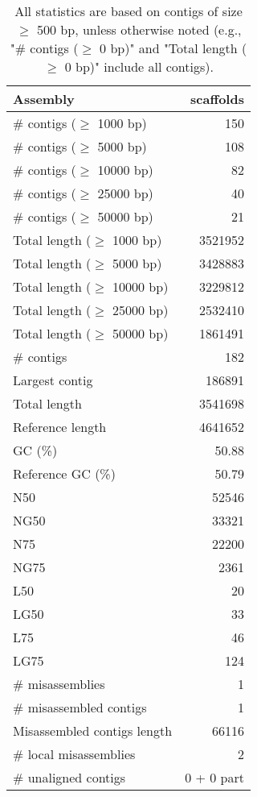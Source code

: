 \documentclass[12pt,a4paper]{article}
\begin{document}
\begin{table}[ht]
\begin{center}
\caption{All statistics are based on contigs of size $\geq$ 500 bp, unless otherwise noted (e.g., "\# contigs ($\geq$ 0 bp)" and "Total length ($\geq$ 0 bp)" include all contigs).}
\begin{tabular}{|l*{1}{|r}|}
\hline
Assembly & scaffolds \\ \hline
\# contigs ($\geq$ 1000 bp) & 150 \\ \hline
\# contigs ($\geq$ 5000 bp) & 108 \\ \hline
\# contigs ($\geq$ 10000 bp) & 82 \\ \hline
\# contigs ($\geq$ 25000 bp) & 40 \\ \hline
\# contigs ($\geq$ 50000 bp) & 21 \\ \hline
Total length ($\geq$ 1000 bp) & 3521952 \\ \hline
Total length ($\geq$ 5000 bp) & 3428883 \\ \hline
Total length ($\geq$ 10000 bp) & 3229812 \\ \hline
Total length ($\geq$ 25000 bp) & 2532410 \\ \hline
Total length ($\geq$ 50000 bp) & 1861491 \\ \hline
\# contigs & 182 \\ \hline
Largest contig & 186891 \\ \hline
Total length & 3541698 \\ \hline
Reference length & 4641652 \\ \hline
GC (\%) & 50.88 \\ \hline
Reference GC (\%) & 50.79 \\ \hline
N50 & 52546 \\ \hline
NG50 & 33321 \\ \hline
N75 & 22200 \\ \hline
NG75 & 2361 \\ \hline
L50 & 20 \\ \hline
LG50 & 33 \\ \hline
L75 & 46 \\ \hline
LG75 & 124 \\ \hline
\# misassemblies & 1 \\ \hline
\# misassembled contigs & 1 \\ \hline
Misassembled contigs length & 66116 \\ \hline
\# local misassemblies & 2 \\ \hline
\# unaligned contigs & 0 + 0 part \\ \hline

\end{tabular}
\end{center}
\end{table}
\end{document}
